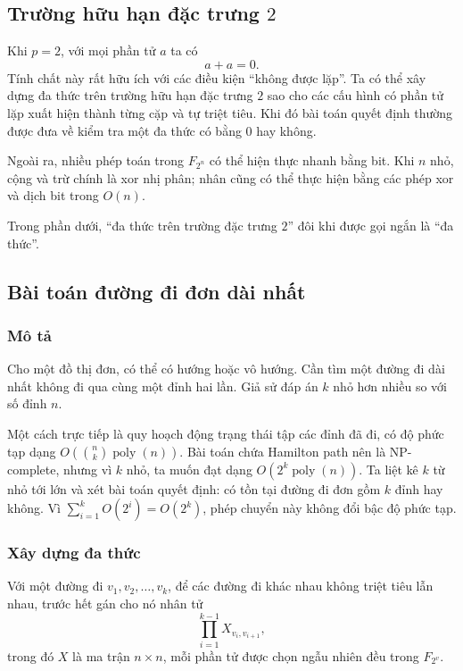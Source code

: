 \documentclass[11pt]{article}
\begin{document}
\subsection{\texorpdfstring{Trường hữu hạn đặc trưng \(2\)}{Trường hữu hạn đặc trưng 2}}

Khi \(p=2\), với mọi phần tử \(a\) ta có
\[
  a+a=0.
\]
Tính chất này rất hữu ích với các điều kiện ``không được lặp''. Ta có thể xây
dựng đa thức trên trường hữu hạn đặc trưng \(2\) sao cho các cấu hình có phần
tử lặp xuất hiện thành từng cặp và tự triệt tiêu. Khi đó bài toán quyết định
thường được đưa về kiểm tra một đa thức có bằng \(0\) hay không.

Ngoài ra, nhiều phép toán trong \(F_{2^n}\) có thể hiện thực nhanh bằng bit. Khi
\(n\) nhỏ, cộng và trừ chính là xor nhị phân; nhân cũng có thể thực hiện bằng
các phép xor và dịch bit trong \(O(n)\).

Trong phần dưới, ``đa thức trên trường đặc trưng \(2\)'' đôi khi được gọi ngắn
là ``đa thức''.

\subsection{Bài toán đường đi đơn dài nhất}

\subsubsection{Mô tả}

Cho một đồ thị đơn, có thể có hướng hoặc vô hướng. Cần tìm một đường đi dài
nhất không đi qua cùng một đỉnh hai lần. Giả sử đáp án \(k\) nhỏ hơn nhiều so
với số đỉnh \(n\).

Một cách trực tiếp là quy hoạch động trạng thái tập các đỉnh đã đi, có độ phức
tạp dạng \(O(\binom nk\operatorname{poly}(n))\). Bài toán chứa Hamilton path
nên là NP-complete, nhưng vì \(k\) nhỏ, ta muốn đạt dạng \(O(2^k
\operatorname{poly}(n))\). Ta liệt kê \(k\) từ nhỏ tới lớn và xét bài toán
quyết định: có tồn tại đường đi đơn gồm \(k\) đỉnh hay không. Vì
\(\sum_{i=1}^k O(2^i)=O(2^k)\), phép chuyển này không đổi bậc độ phức tạp.

\subsubsection{Xây dựng đa thức}

Với một đường đi \(v_1,v_2,\ldots,v_k\), để các đường đi khác nhau không triệt
tiêu lẫn nhau, trước hết gán cho nó nhân tử
\[
  \prod_{i=1}^{k-1} X_{v_i,v_{i+1}},
\]
trong đó \(X\) là ma trận \(n\times n\), mỗi phần tử được chọn ngẫu nhiên đều
trong \(F_{2^v}\).
\end{document}
